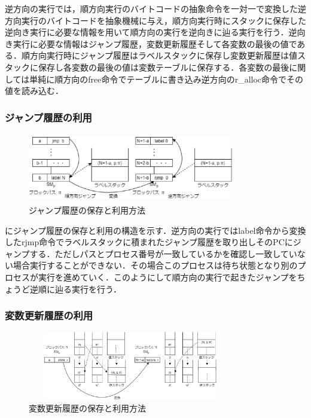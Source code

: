 \documentclass[submit,PRO]{ipsj}
\begin{document}
逆方向の実行では，順方向実行のバイトコードの抽象命令を一対一で変換した逆方向実行のバイトコードを抽象機械に与え，順方向実行時にスタックに保存した逆向き実行に必要な情報を用いて順方向の実行を逆向きに辿る実行を行う．逆向き実行に必要な情報はジャンプ履歴，変数更新履歴そして各変数の最後の値である．順方向実行時にジャンプ履歴はラベルスタックに保存し変数更新履歴は値スタックに保存し各変数の最後の値は変数テーブルに保存する．各変数の最後に関しては単純に順方向のfree命令でテーブルに書き込み逆方向のr\_alloc命令でその値を読み込む．


\subsubsection{ジャンプ履歴の利用}

\begin{figure}[tb]
\includegraphics[height=3.0cm,width=9.0cm]{jmp.eps}
\caption{ジャンプ履歴の保存と利用方法}
\label{fig:jmp}
\end{figure}

にジャンプ履歴の保存と利用の構造を示す．逆方向の実行ではlabel命令から変換したrjmp命令でラベルスタックに積まれたジャンプ履歴を取り出しそのPCにジャンプする．ただしパスとプロセス番号が一致しているかを確認し一致していない場合実行することができない．その場合このプロセスは待ち状態となり別のプロセスが実行を進めていく．このようにして順方向の実行で起きたジャンプをちょうど逆順に辿る実行を行う．

\subsubsection{変数更新履歴の利用}

\begin{figure}[tb]
\includegraphics[height=3.0cm,width=9.0cm]{store.eps}
\caption{変数更新履歴の保存と利用方法}
\label{fig:store}
\end{figure}
\end{document}
